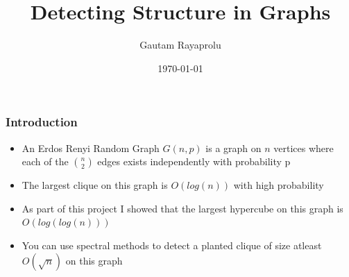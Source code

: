 \documentclass{beamer}
\title[Detecting Structure in Graphs]{Detecting Structure in Graphs } %
\author{Gautam Rayaprolu} %
\institute[McGill University] %
{
McGill University \\ %
\medskip
\textit{gautam.rayaprolu@mail.mcgill.ca} %
}
\date{\today} %
\begin{document}
\begin{frame}
\titlepage %
\end{frame}






\begin{frame}
\frametitle{Introduction}
\begin{itemize}
\item An Erdos Renyi Random Graph $G(n,p)$ is a graph on $n$ vertices where each of the $n \choose 2$ edges exists independently with probability p
\item The largest clique on this graph is $O(log(n))$ with high probability
\item As part of this project I showed that the largest hypercube on this graph is $O(log(log(n)))$
\item You can use spectral methods to detect a planted clique of size atleast $O(\sqrt{n})$ on this graph
\end{itemize}
\end{frame}
\end{document}
